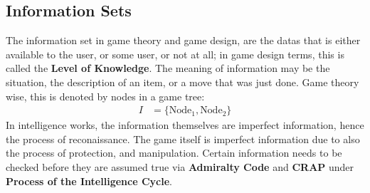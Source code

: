 \documentclass{article}
\begin{document}
\subsection{Information Sets}
The information set in game theory and game design, are the datas that is either available to the user, or some user, or not at all; in game design terms, this is called the \textbf{Level of Knowledge}. The meaning of information may be the situation, the description of an item, or a move that was just done. Game theory wise, this is denoted by nodes in a game tree:
\begin{align*}
  I &= \{ \text{Node}_1, \text{Node}_2 \}
\end{align*}
In intelligence works, the information themselves are imperfect information, hence the process of reconaissance. The game itself is imperfect information due to also the process of protection, and manipulation. Certain information needs to be checked before they are assumed true via \textbf{Admiralty Code} and \textbf{CRAP} under \textbf{Process of the Intelligence Cycle}.

\begin{center}
\end{center}
\end{document}
